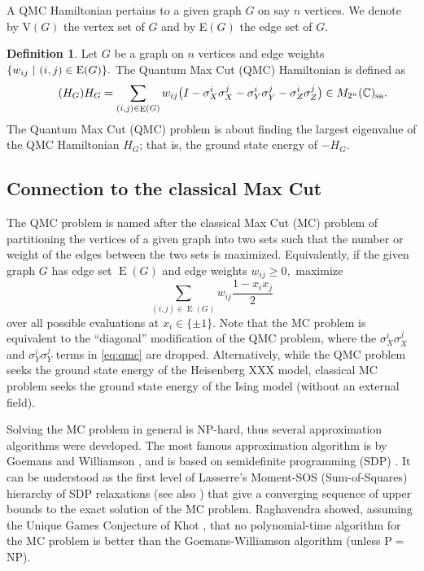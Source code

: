 \documentclass[12pt,dvipsnames,accepted=2016-08-18,a4paper,onecolumn]{quantumarticle}
\DeclareMathOperator{\EE}{E}
\numberwithin{equation}{section}
\newcommand{\CC}{\mathbb C}
\theoremstyle{definition}
\newtheorem{definition}[theorem]{Definition}
\begin{document}
A QMC Hamiltonian pertains to a given graph $G$ on say $n$ vertices. We denote by V$(G)$ the vertex set of $G$ and by E$(G)$ the edge set of $G.$ 

\begin{definition}
    Let $G$ be a graph on $n$ vertices and edge weights $\{w_{ij} \ | \ (i,j) \in \textnormal{E}(G)\}.$  The Quantum Max Cut (QMC) Hamiltonian is defined as
    \begin{equation}\label{eq:qmc}\tag{$H_G$}
         H_G = \sum_{(i,j) \in \EE(G)} w_{ij}\big(I - \sigma_X^i \sigma_X^j - \sigma_Y^i \sigma_Y^j - \sigma_Z^i \sigma_Z^j\big)\in M_{2^n}(\CC)_{\rm sa}.
    \end{equation}
    The Quantum Max Cut (QMC) problem is about finding the largest eigenvalue of the QMC Hamiltonian $H_G$; that is, the ground state energy of $-H_G$. 
\end{definition}

\subsection{Connection to the classical Max Cut}\label{sec:clasMC}
The QMC problem is named after the classical Max Cut (MC) problem \cite{BPT13}
of partitioning the vertices of a given graph into two sets such that the number or weight of the edges between the two sets is maximized. Equivalently, if the given graph $G$ has edge set $\EE(G)$ and edge weights $w_{ij}\geq0,$ maximize
$$
\sum_{(i,j) \in \EE(G)} w_{ij}\frac{1-x_ix_j}{2}
$$
over all possible evaluations at $x_i \in \{\pm 1\}.$ 
Note that the MC problem is equivalent to the ``diagonal'' modification of the QMC problem, where the $\sigma_X^i \sigma_X^j$ and $\sigma_Y^i \sigma_Y^j$ terms in \eqref{eq:qmc} are dropped.
Alternatively, while the QMC problem seeks the ground state energy of the Heisenberg XXX model, classical MC problem seeks the ground state energy of the Ising model (without an external field).

Solving the MC problem in general is NP-hard, thus several approximation algorithms were developed. 
The most famous approximation algorithm is by Goemans and Williamson \cite{GW95}, and is based on semidefinite programming (SDP) \cite{BPT13}. 
It can be understood as the first level of
Lasserre's Moment-SOS (Sum-of-Squares) hierarchy of SDP relaxations \cite{Las} (see also \cite{Lau,HKL,Nie23}) that give a converging sequence of upper bounds to the exact solution of the MC problem. 
Raghavendra \cite{Rag08,Rag09} showed, assuming the Unique Games Conjecture of Khot \cite{Kho02}, that no polynomial-time algorithm for the MC problem is better than the Goemans-Williamson algorithm (unless P$=$NP).
\end{document}
